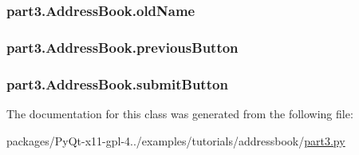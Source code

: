 \subsubsection[{old\+Name}]{\setlength{\rightskip}{0pt plus 5cm}part3.\+Address\+Book.\+old\+Name}\label{classpart3_1_1AddressBook_a329c9cb4022e5c1cf938a3c9ab4517d5}
\hypertarget{classpart3_1_1AddressBook_a36cfb2167f8945bdb1b0f1a0de2e9670}{}
\subsubsection[{previous\+Button}]{\setlength{\rightskip}{0pt plus 5cm}part3.\+Address\+Book.\+previous\+Button}\label{classpart3_1_1AddressBook_a36cfb2167f8945bdb1b0f1a0de2e9670}
\hypertarget{classpart3_1_1AddressBook_a35ff3561370205cd211093b6153937a9}{}
\subsubsection[{submit\+Button}]{\setlength{\rightskip}{0pt plus 5cm}part3.\+Address\+Book.\+submit\+Button}\label{classpart3_1_1AddressBook_a35ff3561370205cd211093b6153937a9}


The documentation for this class was generated from the following file\+:\begin{DoxyCompactItemize}
\item 
packages/\+Py\+Qt-\/x11-\/gpl-\/4../examples/tutorials/addressbook/\hyperlink{part3_8py}{part3.\+py}\end{DoxyCompactItemize}
